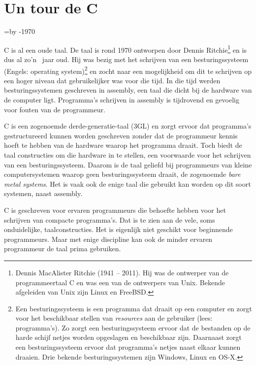 \chapter{Un tour de C}
\label{cha:tour}
\thispagestyle{empty}

\newcount\cdifference\cdifference=\the\year\advance\cdifference by -1970

C is al een oude taal. De taal is rond 1970 ontworpen door Dennis Ritchie\footnote{Dennis MacAlister Ritchie (1941 -- 2011). Hij was de ontwerper van de programmeertaal C en was een van de ontwerpers van Unix. Bekende afgeleiden van Unix zijn Linux en FreeBSD.} en is dus al zo'n \the\cdifference\ jaar oud. Hij was bezig met het schrijven van een besturingssysteem (Engels: operating system)\footnote{Een besturingssysteem is een programma dat draait op een computer en zorgt voor het beschikbaar stellen van \textsl{resources} aan de gebruiker (lees: programma's). Zo zorgt een besturingssysteem ervoor dat de bestanden op de harde schijf netjes worden opgeslagen en beschikbaar zijn. Daarnaast zorgt een besturingssysteem ervoor dat programma's netjes naast elkaar kunnen draaien. Drie bekende besturingssystemen zijn Windows, Linux en OS-X.} en zocht naar een mogelijkheid om dit te schrijven op een hoger niveau dat gebruikelijker was voor die tijd. In die tijd werden besturingssystemen geschreven in assembly, een taal die dicht bij de hardware van de computer ligt. Programma's schrijven in assembly is tijdrovend en gevoelig voor fouten van de programmeur.

C is een zogenoemde derde-generatie-taal (3GL) en zorgt ervoor dat programma's gestructureerd kunnen worden geschreven zonder dat de programmeur kennis hoeft te hebben van de hardware waarop het programma draait. Toch biedt de taal constructies om die hardware in te stellen, een voorwaarde voor het schrijven van een besturingssysteem. Daarom is de taal geliefd bij programmeurs van kleine computersystemen waarop geen besturingssysteem draait, de zogenoemde \textsl{bare metal systems}. Het is vaak ook de enige taal die gebruikt kan worden op dit soort systemen, naast assembly.

C is geschreven voor ervaren programmeurs die behoefte hebben voor het schrijven van compacte programma's. Dat is te zien aan de vele, soms onduidelijke, taalconstructies. Het is eigenlijk niet geschikt voor beginnende programmeurs. 
Maar met enige discipline kan ook de minder ervaren programmeur de taal prima gebruiken.


